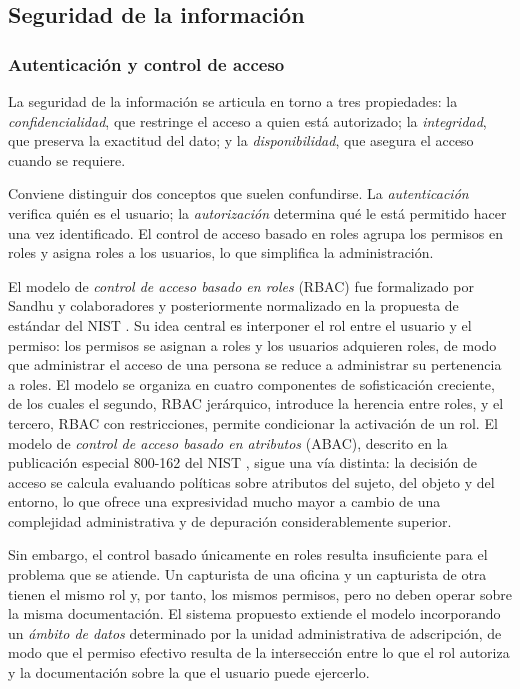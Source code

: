\subsection{Seguridad de la información}
\label{subsec:mt_seguridad}

\subsubsection{Autenticación y control de acceso}

La seguridad de la información se articula en torno a tres propiedades: la \emph{confidencialidad}, que restringe el acceso a quien está autorizado; la \emph{integridad}, que preserva la exactitud del dato; y la \emph{disponibilidad}, que asegura el acceso cuando se requiere.

Conviene distinguir dos conceptos que suelen confundirse. La \emph{autenticación} verifica quién es el usuario; la \emph{autorización} determina qué le está permitido hacer una vez identificado. El control de acceso basado en roles agrupa los permisos en roles y asigna roles a los usuarios, lo que simplifica la administración.

El modelo de \emph{control de acceso basado en roles} (RBAC) fue formalizado por Sandhu y colaboradores \cite{sandhu1996rbac} y posteriormente normalizado en la propuesta de estándar del NIST \cite{ferraiolo2001nist}. Su idea central es interponer el rol entre el usuario y el permiso: los permisos se asignan a roles y los usuarios adquieren roles, de modo que administrar el acceso de una persona se reduce a administrar su pertenencia a roles. El modelo se organiza en cuatro componentes de sofisticación creciente, de los cuales el segundo, RBAC jerárquico, introduce la herencia entre roles, y el tercero, RBAC con restricciones, permite condicionar la activación de un rol. El modelo de \emph{control de acceso basado en atributos} (ABAC), descrito en la publicación especial 800-162 del NIST \cite{hu2014abac}, sigue una vía distinta: la decisión de acceso se calcula evaluando políticas sobre atributos del sujeto, del objeto y del entorno, lo que ofrece una expresividad mucho mayor a cambio de una complejidad administrativa y de depuración considerablemente superior.

Sin embargo, el control basado únicamente en roles resulta insuficiente para el problema que se atiende. Un capturista de una oficina y un capturista de otra tienen el mismo rol y, por tanto, los mismos permisos, pero no deben operar sobre la misma documentación. El sistema propuesto extiende el modelo incorporando un \emph{ámbito de datos} determinado por la unidad administrativa de adscripción, de modo que el permiso efectivo resulta de la intersección entre lo que el rol autoriza y la documentación sobre la que el usuario puede ejercerlo.

